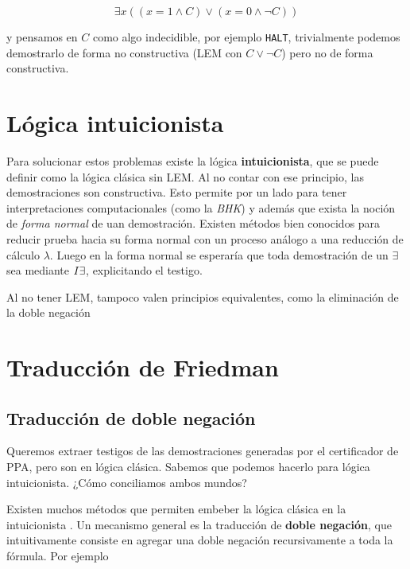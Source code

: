 \[
    \exists x ((x = 1 \wedge C) \vee (x = 0 \wedge \neg C))
\]

y pensamos en $C$ como algo indecidible, por ejemplo \texttt{HALT}, trivialmente
podemos demostrarlo de forma no constructiva (LEM con $C \vee \neg C$) pero no
de forma constructiva.

\section{Lógica intuicionista}

Para solucionar estos problemas existe la lógica \textbf{intuicionista}, que se
puede definir como la lógica clásica sin LEM. Al no contar con ese principio,
las demostraciones son constructiva. Esto permite por un lado para tener
interpretaciones computacionales (como la \textit{BHK}) y además que exista la
noción de \textit{forma normal} de uan demostración. Existen métodos bien
conocidos para reducir prueba hacia su
forma normal con un proceso análogo a una reducción de cálculo $\lambda$. Luego
en la forma normal se esperaría que toda demostración de un $\exists$ sea
mediante $I\exists$, explicitando el testigo.

Al no tener LEM, tampoco valen principios equivalentes, como la eliminación de
la doble negación 

\section{Traducción de Friedman}

\subsection{Traducción de doble negación}

Queremos extraer testigos de las demostraciones generadas por el certificador de
PPA, pero son en lógica clásica. Sabemos que podemos hacerlo para lógica
intuicionista. ¿Cómo conciliamos ambos mundos?

Existen muchos métodos que permiten embeber la lógica clásica en la
intuicionista . Un mecanismo general es la traducción de
\textbf{doble negación}, que intuitivamente consiste en agregar una doble
negación recursivamente a toda la fórmula. Por ejemplo

\newcommand{\gN}[1]{#1^{\text{N}}}

